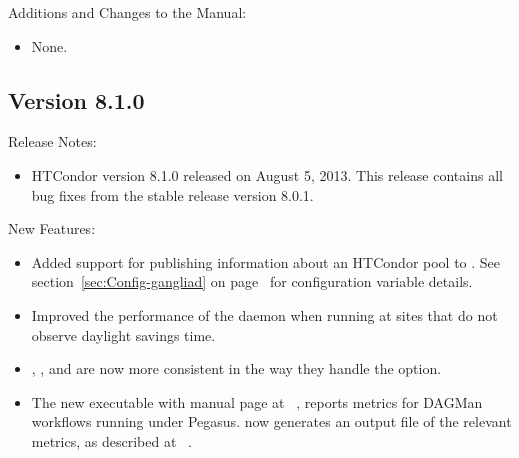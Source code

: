 \noindent Additions and Changes to the Manual:

\begin{itemize}

\item None.

\end{itemize}


\subsection*{\label{sec:New-8-1-0}Version 8.1.0}

\noindent Release Notes:

\begin{itemize}

\item HTCondor version 8.1.0 released on August 5, 2013.
This release contains all bug fixes from the stable release version 8.0.1.

\end{itemize}


\noindent New Features:

\begin{itemize}

\item Added support for publishing information about an HTCondor pool 
to .
See section~\ref{sec:Config-gangliad} on 
page~\pageref{sec:Config-gangliad} for configuration variable details.

\item Improved the performance of the  daemon when running
at sites that do not observe daylight savings time.

\item {}, ,  and  are now 
more consistent in the way they handle the  option.

\item The new  executable
with manual page at ~\pageref{man-condor-dagman-metrics-reporter},
reports metrics for DAGMan workflows running under Pegasus.  
now generates an output file of the relevant metrics,
as described at ~\pageref{sec:DAGMetrics}.

\end{itemize}

